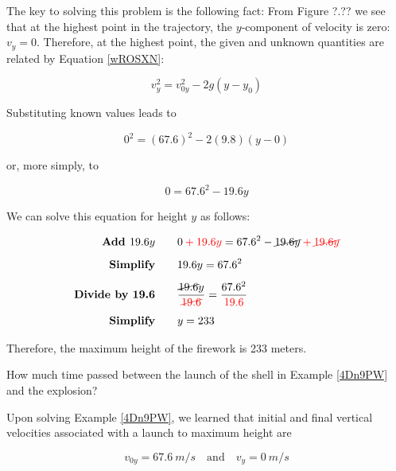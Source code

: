 \documentclass[main.tex]{subfiles}
\begin{document}
The key to solving this problem is the following fact: From Figure ?.?? we see that at the highest point in the trajectory, the $y$-component of velocity is zero: $v_y = 0$. Therefore, at the highest point, the given and unknown quantities are related by Equation \eqref{wROSXN}:

\begin{equation*}
    v_y^2 = v_{0y}^2 - 2 g \left(y-y_0\right)
\end{equation*}

Substituting known values leads to

\begin{equation*}
    0^2 = \left(67.6\right)^2 - 2 (9.8) \left(y - 0\right)
\end{equation*}

or, more simply, to

\begin{equation*}
    0 = 67.6^2 - 19.6 y
\end{equation*}

We can solve this equation for height $y$ as follows:

\begin{align*}
    \textbf{Add $19.6 y$} \qquad & 0 \mathbin{\color{red} +} \textcolor{red}{19.6 y} = 67.6^2 - \cancel{19.6 y} \mathbin{\color{red} +} \textcolor{red}{\cancel{19.6 y}}\\[1ex]
    \textbf{Simplify} \qquad & 19.6 y = 67.6^2\\[1ex]
    \textbf{Divide by 19.6} \qquad & \frac{\cancel{19.6} y}{\textcolor{red}{\cancel{19.6}}} = \frac{67.6^2}{\textcolor{red}{19.6}}\\[1ex]
    \textbf{Simplify} \qquad & y = 233
\end{align*}

Therefore, the maximum height of the firework is 233 meters.

\solutionEnd

\begin{example} \label{t57osh}
    How much time passed between the launch of the shell in Example \ref{4Dn9PW} and the explosion?
\end{example}

\Solution
Upon solving Example \ref{4Dn9PW}, we learned that initial and final vertical velocities associated with a launch to maximum height are

\begin{equation*}
    v_{0y} = \SI{67.6}{m/s} \quad \text{and} \quad v_y = \SI{0}{m/s}
\end{equation*}
\end{document}
